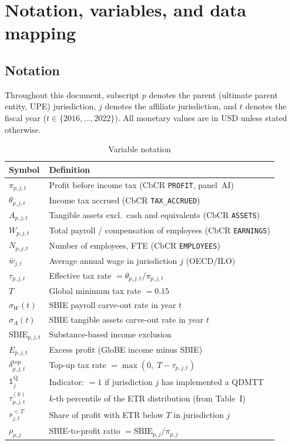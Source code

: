 \documentclass[11pt,a4paper]{article}
\newcommand{\code}[1]{\texttt{#1}}
\begin{document}
\section{Notation, variables, and data mapping}\label{sec:data}

\subsection{Notation}\label{sec:notation}

Throughout this document, subscript $p$ denotes the parent (ultimate parent entity, UPE) jurisdiction, $j$ denotes the affiliate jurisdiction, and $t$ denotes the fiscal year ($t \in \{2016, \ldots, 2022\}$). All monetary values are in USD unless stated otherwise.

\begin{table}[H]
\centering
\caption{Variable notation}
\label{tab:notation}
\small
\begin{tabular}{@{}ll@{}}
\toprule
Symbol & Definition \\
\midrule
$\pi_{p,j,t}$ & Profit before income tax (CbCR \code{PROFIT}, panel~AI) \\
$\theta_{p,j,t}$ & Income tax accrued (CbCR \code{TAX\_ACCRUED}) \\
$A_{p,j,t}$ & Tangible assets excl.\ cash and equivalents (CbCR \code{ASSETS}) \\
$W_{p,j,t}$ & Total payroll / compensation of employees (CbCR \code{EARNINGS}) \\
$N_{p,j,t}$ & Number of employees, FTE (CbCR \code{EMPLOYEES}) \\
$\bar{w}_{j,t}$ & Average annual wage in jurisdiction $j$ (OECD/ILO) \\
$\tau_{p,j,t}$ & Effective tax rate $= \theta_{p,j,t} / \pi_{p,j,t}$ \\
$T$ & Global minimum tax rate $= 0.15$ \\
$\sigma_W(t)$ & SBIE payroll carve-out rate in year $t$ \\
$\sigma_A(t)$ & SBIE tangible assets carve-out rate in year $t$ \\
$\text{SBIE}_{p,j,t}$ & Substance-based income exclusion \\
$E_{p,j,t}$ & Excess profit (GloBE income minus SBIE) \\
$\delta_{p,j,t}^{\text{top}}$ & Top-up tax rate $= \max(0,\; T - \tau_{p,j,t})$ \\
$\mathbb{1}_j^{\text{Q}}$ & Indicator: $=1$ if jurisdiction $j$ has implemented a QDMTT \\
$\tau_{p,j,t}^{(k)}$ & $k$-th percentile of the ETR distribution (from Table~I) \\
$s_{j,t}^{<T}$ & Share of profit with ETR below $T$ in jurisdiction $j$ \\
$\rho_{p,j}$ & SBIE-to-profit ratio $= \text{SBIE}_{p,j} / \pi_{p,j}$ \\
\bottomrule
\end{tabular}
\end{table}
\end{document}
